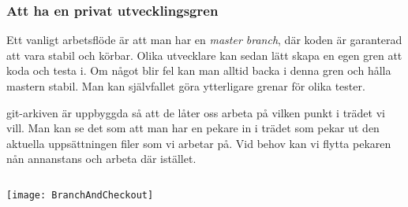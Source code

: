 \documentclass[swedish]{beamer}
\newenvironment{dialogue}{%
\VerbatimEnvironment
\begin{Verbatim}[fontsize=\footnotesize,commandchars=\#\(\)]%
}
{%
\end{Verbatim}
}
\begin{document}





\begin{frame}[fragile]
\frametitle{Att ha en privat utvecklingsgren}
Ett vanligt arbetsflöde är att man har en \emph{master branch}, där koden är garanterad att vara stabil och körbar.  Olika utvecklare kan sedan lätt skapa en egen gren att koda och testa i.  Om något blir fel kan man alltid backa i denna gren och hålla mastern stabil.  Man kan självfallet göra ytterligare grenar för olika tester.

git-arkiven är uppbyggda så att de låter oss arbeta på vilken punkt i trädet vi vill.  Man kan se det som att man har en pekare in i trädet som pekar ut den aktuella uppsättningen filer som vi arbetar på.  Vid behov kan vi flytta pekaren nån annanstans och arbeta där istället.
\end{frame}

\begin{frame}[fragile]
  \begin{columns}
    \begin{column}{0.5\textwidth}

\vspace{\baselineskip}

\texttt{[image: BranchAndCheckout]}
    \end{column}
  \end{columns}
  
\end{frame}
\end{document}
